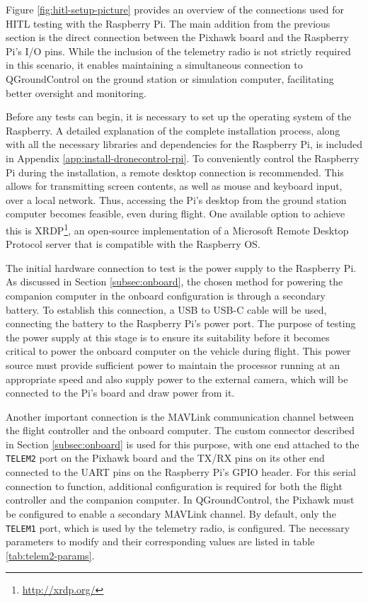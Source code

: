 Figure \ref{fig:hitl-setup-picture} provides an overview of the connections used for HITL testing with the Raspberry Pi. The main addition from the previous section is the direct connection between the Pixhawk board and the Raspberry Pi's I/O pins. While the inclusion of the telemetry radio is not strictly required in this scenario, it enables maintaining a simultaneous connection to QGroundControl on the ground station or simulation computer, facilitating better oversight and monitoring.

Before any tests can begin, it is necessary to set up the operating system of the Raspberry. A detailed explanation of the complete installation process, along with all the necessary libraries and dependencies for the Raspberry Pi, is included in Appendix \ref{app:install-dronecontrol-rpi}. To conveniently control the Raspberry Pi during the installation, a remote desktop connection is recommended. This allows for transmitting screen contents, as well as mouse and keyboard input, over a local network. Thus, accessing the Pi's desktop from the ground station computer becomes feasible, even during flight. One available option to achieve this is XRDP\footnote{\url{http://xrdp.org/}}, an open-source implementation of a Microsoft Remote Desktop Protocol server that is compatible with the Raspberry OS.


The initial hardware connection to test is the power supply to the Raspberry Pi. As discussed in Section \ref{subsec:onboard}, the chosen method for powering the companion computer in the onboard configuration is through a secondary battery. To establish this connection, a USB to USB-C cable will be used, connecting the battery to the Raspberry Pi's power port. The purpose of testing the power supply at this stage is to ensure its suitability before it becomes critical to power the onboard computer on the vehicle during flight. This power source must provide sufficient power to maintain the processor running at an appropriate speed and also supply power to the external camera, which will be connected to the Pi's board and draw power from it.


Another important connection is the MAVLink communication channel between the flight controller and the onboard computer. The custom connector described in Section \ref{subsec:onboard} is used for this purpose, with one end attached to the \texttt{TELEM2} port on the Pixhawk board and the TX/RX pins on its other end connected to the UART pins on the Raspberry Pi's GPIO header. For this serial connection to function, additional configuration is required for both the flight controller and the companion computer. In QGroundControl, the Pixhawk must be configured to enable a secondary MAVLink channel. By default, only the \texttt{TELEM1} port, which is used by the telemetry radio, is configured. The necessary parameters to modify and their corresponding values are listed in table \ref{tab:telem2-params}.

